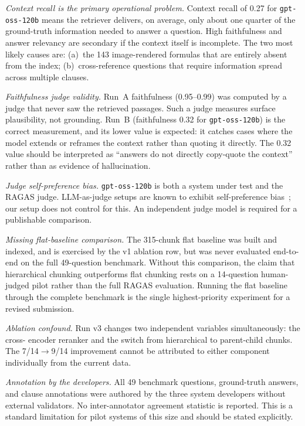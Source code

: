 \documentclass[conference]{IEEEtran}
\begin{document}
\textit{Context recall is the primary operational problem.}
Context recall of 0.27 for \texttt{gpt-oss-120b} means the retriever
delivers, on average, only about one quarter of the ground-truth
information needed to answer a question.
High faithfulness and answer relevancy are secondary if the context
itself is incomplete.
The two most likely causes are: (a)~the 143 image-rendered formulas
that are entirely absent from the index; (b)~cross-reference questions
that require information spread across multiple clauses.

\textit{Faithfulness judge validity.}
Run~A faithfulness (0.95--0.99) was computed by a judge that never saw
the retrieved passages.
Such a judge measures surface plausibility, not grounding.
Run~B (faithfulness 0.32 for \texttt{gpt-oss-120b}) is the correct
measurement, and its lower value is expected: it catches cases where
the model extends or reframes the context rather than quoting it
directly.
The 0.32 value should be interpreted as ``answers do not directly
copy-quote the context'' rather than as evidence of hallucination.

\textit{Judge self-preference bias.}
\texttt{gpt-oss-120b} is both a system under test and the RAGAS judge.
LLM-as-judge setups are known to exhibit self-preference
bias~\cite{es2023ragas}; our setup does not control for this.
An independent judge model is required for a publishable comparison.

\textit{Missing flat-baseline comparison.}
The 315-chunk flat baseline was built and indexed, and is exercised by
the v1 ablation row, but was never evaluated end-to-end on the full
49-question benchmark.
Without this comparison, the claim that hierarchical chunking
outperforms flat chunking rests on a 14-question human-judged pilot
rather than the full RAGAS evaluation.
Running the flat baseline through the complete benchmark is the
single highest-priority experiment for a revised submission.

\textit{Ablation confound.}
Run v3 changes two independent variables simultaneously: the cross-
encoder reranker and the switch from hierarchical to parent-child
chunks.
The 7/14$\to$9/14 improvement cannot be attributed to either component
individually from the current data.

\textit{Annotation by the developers.}
All 49 benchmark questions, ground-truth answers, and clause
annotations were authored by the three system developers without
external validators.
No inter-annotator agreement statistic is reported.
This is a standard limitation for pilot systems of this size and
should be stated explicitly.
\end{document}
